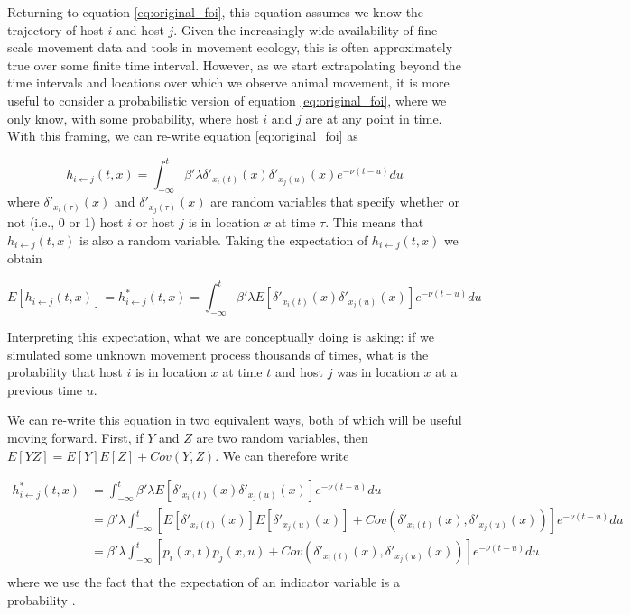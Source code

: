 \documentclass[letterpaper]{article}
\begin{document}
Returning to equation \ref{eq:original_foi}, this equation assumes we know the trajectory of host $i$ and host $j$.  Given the increasingly wide availability of fine-scale movement data and tools in movement ecology, this is often approximately true over some finite time interval. However, as we start extrapolating beyond the time intervals and locations over which we observe animal movement, it is more useful to consider a probabilistic version of equation \ref{eq:original_foi}, where we only know, with some probability, where host $i$ and $j$ are at any point in time. With this framing, we can re-write equation \ref{eq:original_foi} as

\begin{equation}
    h_{i \leftarrow j}(t, x) = \int_{-\infty}^{t} \beta' \lambda \delta'_{x_i(t)}(x) \delta'_{x_j(u)}(x) e^{-\nu(t - u)} du
    \label{eq:prob_foi}
\end{equation}
where $\delta'_{x_i(\tau)}(x)$ and $\delta'_{x_j(\tau)}(x)$ are random variables that specify whether or not (i.e., 0 or 1) host $i$ or host $j$ is in location $x$ at time $\tau$.  This means that $h_{i \leftarrow j}(t, x)$ is also a random variable. Taking the expectation of $h_{i \leftarrow j}(t, x)$ we obtain

\begin{equation}
    E[h_{i \leftarrow j}(t, x)] = h^*_{i \leftarrow j}(t, x) = \int_{-\infty}^{t} \beta' \lambda E[\delta'_{x_i(t)}(x) \delta'_{x_j(u)}(x)] e^{-\nu(t - u)} du
    \label{eq:expected_foi}
\end{equation}

Interpreting this expectation, what we are conceptually doing is asking: if we simulated some unknown movement process thousands of times, what is the probability that host $i$ is in location $x$ at time $t$ and host $j$ was in location $x$ at a previous time $u$. 

We can re-write this equation in two equivalent ways, both of which will be useful moving forward.  First, if $Y$ and $Z$ are two random variables, then $E[YZ] = E[Y]E[Z] + Cov(Y, Z)$.  We can therefore write

\begin{equation}
    \begin{aligned}
        h^*_{i \leftarrow j}(t, x) &= \int_{-\infty}^{t} \beta' \lambda E[\delta'_{x_i(t)}(x) \delta'_{x_j(u)}(x)] e^{-\nu(t - u)} du \\
        &= \beta' \lambda \int_{-\infty}^{t} [E[\delta'_{x_i(t)}(x)] E[\delta'_{x_j(u)}(x)] + Cov(\delta'_{x_i(t)}(x), \delta'_{x_j(u)}(x))] e^{-\nu(t - u)} du \\
        &= \beta' \lambda \int_{-\infty}^{t} [p_i(x, t) p_j(x, u) + Cov(\delta'_{x_i(t)}(x), \delta'_{x_j(u)}(x))] e^{-\nu(t - u)} du \\
    \end{aligned}
    \label{eq:foi_cov}
\end{equation}
where we use the fact that the expectation of an indicator variable is a probability \citep{Grimmett2001}.
\end{document}
